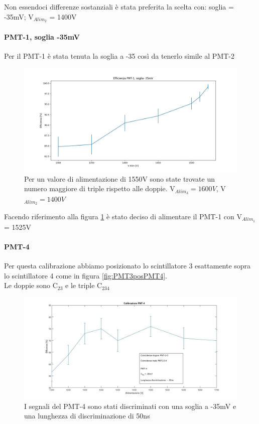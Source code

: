 \documentclass[a4paper]{article}
\begin{document}
Non essendoci differenze sostanziali è stata preferita la scelta con: soglia = -35mV; V$_{Alim_2}$ = 1400V

\paragraph{PMT-1, soglia -35mV}
Per il PMT-1 è stata tenuta la soglia a -35 così da tenerlo simile al PMT-2

\begin{figure}[H]
\centering
\includegraphics[scale=0.3]{./immagini/TimeOfFlight/EffPMT135mV}
\caption{Per un valore di alimentazione di 1550V sono state trovate un numero maggiore di triple rispetto alle doppie. V$_{Alim_3}=1600V$, V$_{Alim_2}=1400V$}
\label{fig:EffPMT135mV}
\end{figure}

Facendo riferimento alla figura \ref{fig:EffPMT135mV} è stato deciso di alimentare il PMT-1 con V$_{Alim_1}$ = 1525V


\paragraph{PMT-4}
\label{sec:CalPMT-4}
Per questa calibrazione abbiamo posizionato lo scintillatore 3 esattamente sopra lo scintillatore 4 come in figura \ref{fig:PMT3posPMT4}.\\
Le doppie sono C$_{23}$ e le triple C$_{234}$

\begin{figure}[H]
\centering
\includegraphics[scale=0.25]{./immagini/TimeOfFlight/CoincidenzePMT4.jpg}
\caption{I segnali del PMT-4 sono stati discriminati con una soglia a -35mV e una lunghezza di discriminazione di 50ns}
\label{fig:EffPMT4}
\end{figure}
\end{document}
